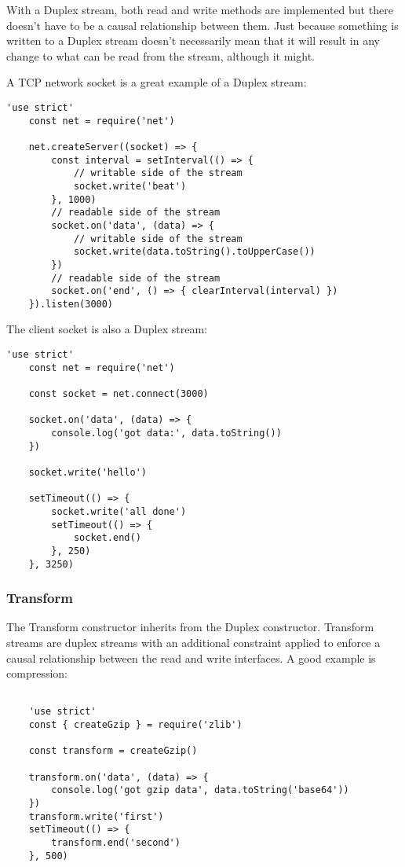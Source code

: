 \documentclass{scrartcl}
\begin{document}
With a Duplex stream, both read and write methods are implemented but there doesn't have to be a causal relationship between them. Just because something is written to a Duplex stream doesn't necessarily mean that it will result in any change to what can be read from the stream, although it might.

A TCP network socket is a great example of a Duplex stream:

\begin{lstlisting}[style=ES6]
    'use strict'
    const net = require('net')

    net.createServer((socket) => {
        const interval = setInterval(() => {
            // writable side of the stream
            socket.write('beat')
        }, 1000)
        // readable side of the stream
        socket.on('data', (data) => {
            // writable side of the stream
            socket.write(data.toString().toUpperCase())
        })
        // readable side of the stream
        socket.on('end', () => { clearInterval(interval) })
    }).listen(3000)
\end{lstlisting}

The client socket is also a Duplex stream:

\begin{lstlisting}[style=ES6]
    'use strict'
    const net = require('net')

    const socket = net.connect(3000)

    socket.on('data', (data) => {
        console.log('got data:', data.toString())
    })

    socket.write('hello')

    setTimeout(() => {
        socket.write('all done')
        setTimeout(() => {
            socket.end()
        }, 250)
    }, 3250)
\end{lstlisting}

\subsubsection{Transform}

The Transform constructor inherits from the Duplex constructor. Transform streams are duplex streams with an additional constraint applied to enforce a causal relationship between the read and write interfaces. A good example is compression:


\begin{lstlisting}[style=ES6]

    'use strict'
    const { createGzip } = require('zlib')

    const transform = createGzip()

    transform.on('data', (data) => {
        console.log('got gzip data', data.toString('base64'))
    })
    transform.write('first')
    setTimeout(() => {
        transform.end('second')
    }, 500)
\end{lstlisting}
\end{document}
